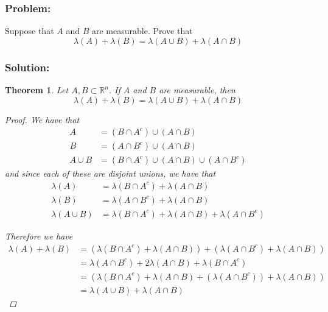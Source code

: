 \documentclass[]{article}
\newcommand{\R}{\mathbb{R}}
\newtheorem{theorem}{Theorem}
\begin{document}
\subsubsection*{Problem:}
Suppose that $A$ and $B$ are measurable. 
Prove that \[
    \lambda(A) + \lambda(B) = \lambda(A \cup B) + \lambda(A \cap B)
\]
\subsubsection*{Solution:}
\begin{theorem}
    Let $A, B \subset \R^n$.
    If $A$ and $B$ are measurable, then \[
        \lambda(A) + \lambda(B) = \lambda(A \cup B) + \lambda(A \cap B)
    \] \begin{proof}
        We have that \begin{align*}
            A &= (B \cap A^c) \cup (A \cap B)\\
            B &= (A \cap B^c) \cup (A \cap B)\\
            A \cup B &= (B \cap A^c) \cup (A \cap B) \cup (A \cap B^c)
        \end{align*} and since each of these are disjoint unions, we have that \begin{align*}
            \lambda(A) &= \lambda(B \cap A^c) + \lambda(A \cap B)\\
            \lambda(B) &= \lambda(A \cap B^c) + \lambda(A \cap B)\\
            \lambda(A \cup B) &= \lambda(B \cap A^c) + \lambda(A \cap B) + \lambda(A \cap B^c)
        \end{align*} 
        
        Therefore we have\begin{align*}
            \lambda(A) + \lambda(B) 
                &= (\lambda(B \cap A^c) + \lambda(A \cap B)) + (\lambda(A \cap B^c) + \lambda(A \cap B))\\
                &= \lambda(A \cap B^c) + 2 \lambda(A \cap B) + \lambda(B \cap A^c)\\
                &= (\lambda(B \cap A^c) + \lambda(A \cap B) + (\lambda(A \cap B^c)) + \lambda(A \cap B))\\
                &= \lambda(A \cup B) + \lambda(A \cap B)
        \end{align*}
    \end{proof}
\end{theorem}

\subsection{}
\end{document}

